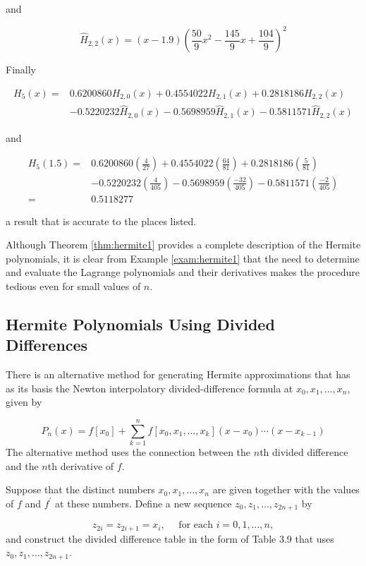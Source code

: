 \begin{mysolution}
and

$$
\hat{H}_{2,2}(x)=(x-1.9)\left(\frac{50}{9} x^{2}-\frac{145}{9} x+\frac{104}{9}\right)^{2}
$$

Finally

$$
\begin{aligned}
H_{5}(x)= & 0.6200860 H_{2,0}(x)+0.4554022 H_{2,1}(x)+0.2818186 H_{2,2}(x) \\
& -0.5220232 \hat{H}_{2,0}(x)-0.5698959 \hat{H}_{2,1}(x)-0.5811571 \hat{H}_{2,2}(x)
\end{aligned}
$$

and

$$
\begin{aligned}
H_{5}(1.5)= & 0.6200860\left(\frac{4}{27}\right)+0.4554022\left(\frac{64}{81}\right)+0.2818186\left(\frac{5}{81}\right) \\
& -0.5220232\left(\frac{4}{405}\right)-0.5698959\left(\frac{-32}{405}\right)-0.5811571\left(\frac{-2}{405}\right) \\
= & 0.5118277
\end{aligned}
$$

a result that is accurate to the places listed.
\end{mysolution}

Although Theorem \ref{thm:hermite1} provides a complete description of the Hermite polynomials, it is clear from Example \ref{exam:hermite1} that the need to determine and evaluate the Lagrange polynomials and their derivatives makes the procedure tedious even for small values of $n$.

\subsection*{Hermite Polynomials Using Divided Differences}
There is an alternative method for generating Hermite approximations that has as its basis the Newton interpolatory divided-difference formula at $x_{0}, x_{1}, \ldots, x_{n}$, given by

$$
P_{n}(x)=f\left[x_{0}\right]+\sum_{k=1}^{n} f\left[x_{0}, x_{1}, \ldots, x_{k}\right]\left(x-x_{0}\right) \cdots\left(x-x_{k-1}\right)
$$
The alternative method uses the connection between the $n$th divided difference and the $n$th derivative of $f$.

Suppose that the distinct numbers $x_{0}, x_{1}, \ldots, x_{n}$ are given together with the values of $f$ and $f^{\prime}$ at these numbers. Define a new sequence $z_{0}, z_{1}, \ldots, z_{2 n+1}$ by

$$
z_{2 i}=z_{2 i+1}=x_{i}, \quad \text { for each } i=0,1, \ldots, n,
$$
and construct the divided difference table in the form of Table 3.9 that uses $z_{0}, z_{1}, \ldots, z_{2 n+1}$.

